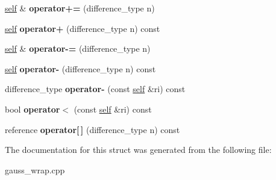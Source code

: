 \begin{DoxyCompactItemize}
\item 
\hypertarget{structswig_1_1_swig_py_sequence___input_iterator_abff285d61554d58f95218ed8b58fb2e8}{\hyperlink{structswig_1_1_swig_py_sequence___input_iterator}{self} \& {\bfseries operator+=} (difference\-\_\-type n)}\label{structswig_1_1_swig_py_sequence___input_iterator_abff285d61554d58f95218ed8b58fb2e8}

\item 
\hypertarget{structswig_1_1_swig_py_sequence___input_iterator_aaa39b3ee02eeac46dda4c1321d114d71}{\hyperlink{structswig_1_1_swig_py_sequence___input_iterator}{self} {\bfseries operator+} (difference\-\_\-type n) const }\label{structswig_1_1_swig_py_sequence___input_iterator_aaa39b3ee02eeac46dda4c1321d114d71}

\item 
\hypertarget{structswig_1_1_swig_py_sequence___input_iterator_a2156567b8085288817b8f2ed9a13500e}{\hyperlink{structswig_1_1_swig_py_sequence___input_iterator}{self} \& {\bfseries operator-\/=} (difference\-\_\-type n)}\label{structswig_1_1_swig_py_sequence___input_iterator_a2156567b8085288817b8f2ed9a13500e}

\item 
\hypertarget{structswig_1_1_swig_py_sequence___input_iterator_a18d3c1e3dc342a602781fa4fac25c268}{\hyperlink{structswig_1_1_swig_py_sequence___input_iterator}{self} {\bfseries operator-\/} (difference\-\_\-type n) const }\label{structswig_1_1_swig_py_sequence___input_iterator_a18d3c1e3dc342a602781fa4fac25c268}

\item 
\hypertarget{structswig_1_1_swig_py_sequence___input_iterator_a9631174072d6dd02a58550cdca00e916}{difference\-\_\-type {\bfseries operator-\/} (const \hyperlink{structswig_1_1_swig_py_sequence___input_iterator}{self} \&ri) const }\label{structswig_1_1_swig_py_sequence___input_iterator_a9631174072d6dd02a58550cdca00e916}

\item 
\hypertarget{structswig_1_1_swig_py_sequence___input_iterator_acad755d5cca0b2468458d6492a9ec525}{bool {\bfseries operator$<$} (const \hyperlink{structswig_1_1_swig_py_sequence___input_iterator}{self} \&ri) const }\label{structswig_1_1_swig_py_sequence___input_iterator_acad755d5cca0b2468458d6492a9ec525}

\item 
\hypertarget{structswig_1_1_swig_py_sequence___input_iterator_a5311872b73135f3532e1e44a4357921d}{reference {\bfseries operator\mbox{[}$\,$\mbox{]}} (difference\-\_\-type n) const }\label{structswig_1_1_swig_py_sequence___input_iterator_a5311872b73135f3532e1e44a4357921d}

\end{DoxyCompactItemize}


The documentation for this struct was generated from the following file\-:\begin{DoxyCompactItemize}
\item 
gauss\-\_\-wrap.\-cpp\end{DoxyCompactItemize}
